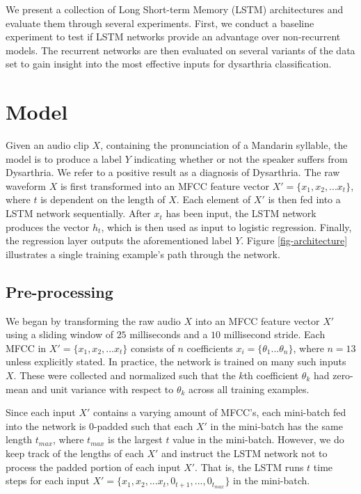 \documentclass[conference]{IEEEtran}
\begin{document}
We present a collection of Long Short-term Memory (LSTM) architectures and evaluate them through several experiments. First, we conduct a baseline experiment to test if LSTM networks provide an advantage over non-recurrent models. The recurrent networks are then evaluated on several variants of the data set to gain insight into the most effective inputs for dysarthria classification.

\section{Model}
Given an audio clip $X$, containing the pronunciation of a Mandarin syllable, the model is to produce a label $Y$ indicating whether or not the speaker suffers from Dysarthria. We refer to a positive result as a diagnosis of Dysarthria. The raw waveform $X$ is first transformed into an MFCC feature vector $X' = \{x_1, x_2,...x_t\}$, where $t$ is dependent on the length of $X$. Each element of $X'$ is then fed into a LSTM network sequentially. After $x_t$ has been input, the LSTM network produces the vector $h_t$, which is then used as input to logistic regression. Finally, the regression layer outputs the aforementioned label $Y$.  Figure \ref{fig-architecture} illustrates a single training example's path through the network. 

\subsection{Pre-processing}
We began by transforming the raw audio $X$ into an MFCC feature vector $X'$ using a sliding window of $25$ milliseconds and a $10$ millisecond stride. Each MFCC in $X' = \{x_1, x_2,...x_t\}$ consists of $n$ coefficients $x_i = \{\theta_1...\theta_{n}\}$, where $n = 13$ unless explicitly stated. In practice, the network is trained on many such inputs $X$. These were collected and normalized such that the $k$th coefficient $\theta_k$ had zero-mean and unit variance with respect to $\theta_k$ across all training examples. 

Since each input $X'$ contains a varying amount of MFCC's, each mini-batch fed into the network is $0$-padded such that each $X'$ in the mini-batch has the same length $t_{max}$, where $t_{max}$ is the largest $t$ value in the mini-batch. However, we do keep track of the lengths of each $X'$ and instruct the LSTM network not to process the padded portion of each input $X'$. That is, the LSTM runs $t$ time steps for each input $X' = \{x_1, x_2,...x_t, 0_{t+1}, ..., 0_{t_{max}}\}$ in the mini-batch.
\end{document}
